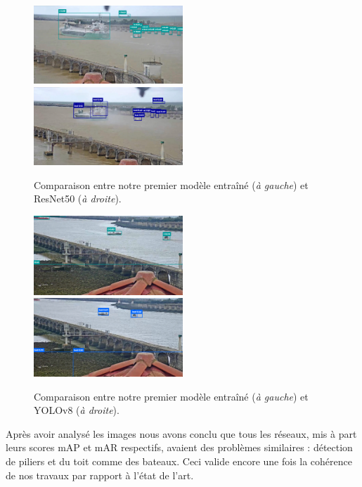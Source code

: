 \begin{figure}[H]
        \includegraphics[width=0.5\textwidth]{./img/first_inference.png}
        \includegraphics[width=0.5\textwidth]{./img/resnet_inference.png}
        \caption{Comparaison entre notre premier modèle entraîné (\textit{à gauche}) et ResNet50 (\textit{à droite}).}
\end{figure}

\begin{figure}[H]
    \includegraphics[width=0.5\textwidth]{./img/first_inference2.png}
    \includegraphics[width=0.5\textwidth]{./img/yolov8_inference.png}
    \caption{Comparaison entre notre premier modèle entraîné (\textit{à gauche}) et YOLOv8 (\textit{à droite}).}
\end{figure}

Après avoir analysé les images nous avons conclu que tous les réseaux, mis à part leurs scores mAP et mAR
respectifs, avaient des problèmes similaires : détection de piliers et du toit comme des bateaux.
Ceci valide encore une fois la cohérence de nos travaux par rapport à l'état de l'art.

